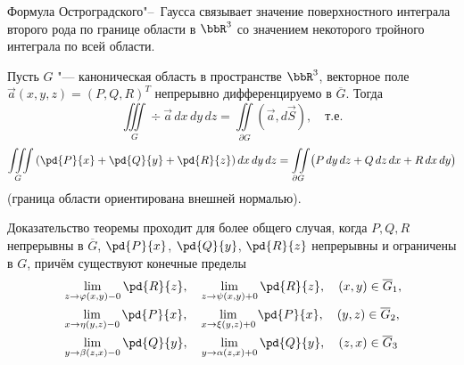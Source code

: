 Формула Остроградского"--~Гаусса связывает значение поверхностного интеграла второго рода по границе области в $\bbR^3$ со значением некоторого тройного интеграла по всей области.

\begin{thm}
Пусть $G$ "--- каноническая область в пространстве $\bbR^3$, векторное поле $\vec{a}(x, y, z) = (P, Q, R)^T$ непрерывно дифференцируемо в $\overline{G}$. Тогда
$$
\iiint\limits_G \div \vec{a}\,dx\,dy\,dz = \iint\limits_{\partial G} (\vec{a}, d\vec{S}), \quad \text{т.е.}
$$
$$
\iiint\limits_G \left( \pd{P}{x} + \pd{Q}{y} + \pd{R}{z} \right) dx\,dy\,dz = \iint\limits_{\partial G} \bigl( P\,dy\,dz + Q\,dz\,dx + R\,dx\,dy \bigr)
$$
(граница области ориентирована внешней нормалью).
\end{thm}

\begin{notion}
Доказательство теоремы проходит для более общего случая, когда $P, Q, R$ непрерывны в $\overline{G}$, $\pd{P}{x}$, $\pd{Q}{y}$, $\pd{R}{z}$ непрерывны и ограничены в $G$, причём существуют конечные пределы
\begin{equation*}
\begin{aligned}
&\lim_{z \to \varphi(x,y)-0} \pd{R}{z}, \quad \lim_{z \to \psi(x,y)+0} \pd{R}{z}, \quad (x, y) \in \overline{G}_1, \\
&\lim_{x \to \eta(y,z)-0} \pd{P}{x}, \quad \lim_{x \to \xi(y,z)+0} \pd{P}{x}, \quad (y, z) \in \overline{G}_2, \\
&\lim_{y \to \beta(z,x)-0} \pd{Q}{y}, \quad \lim_{y \to \alpha(z,x)+0} \pd{Q}{y}, \quad (z, x) \in \overline{G}_3
\end{aligned}
\end{equation*}
\end{notion}

